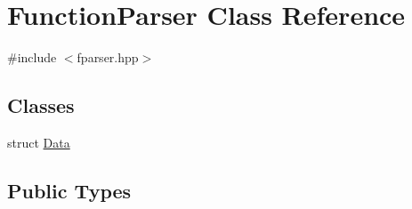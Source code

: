 \hypertarget{class_function_parser}{}\section{Function\+Parser Class Reference}
\label{class_function_parser}


{\ttfamily \#include $<$fparser.\+hpp$>$}

\subsection*{Classes}
\begin{DoxyCompactItemize}
\item 
struct \hyperlink{struct_function_parser_1_1_data}{Data}
\end{DoxyCompactItemize}
\subsection*{Public Types}
